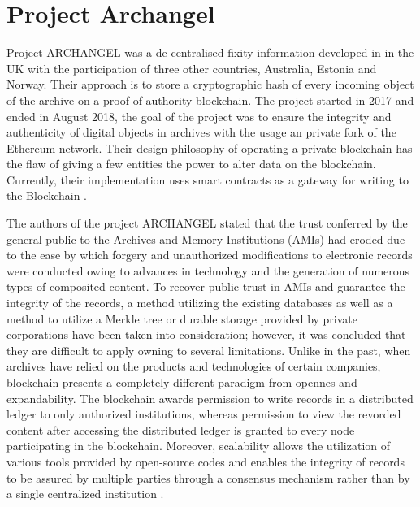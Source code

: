 \section{Project Archangel}
Project ARCHANGEL was a de-centralised fixity information developed in in the UK with the participation of three other countries, Australia, Estonia and Norway. Their approach is to store a cryptographic hash of every incoming object of the archive on a proof-of-authority blockchain. The project started in 2017 and ended in August 2018, the goal of the project was to ensure the integrity and authenticity of digital objects in archives with the usage an private fork of the Ethereum network. Their design philosophy of operating a private blockchain has the flaw of giving a few entities the power to alter data on the blockchain. Currently, their implementation uses smart contracts as a gateway for writing to the Blockchain \cite[4]{collomosse2018archangel}.

The authors of the project ARCHANGEL stated that the trust conferred by the general public to the Archives and Memory Institutions (AMIs) had eroded due to the ease by which forgery and unauthorized modifications to electronic records were conducted owing to advances in technology and the generation of numerous types of composited content. To recover public trust in AMIs and guarantee the integrity of the records, a method utilizing the existing databases as well as a method to utilize a Merkle tree or  durable storage provided by private corporations have been taken into consideration; however, it was concluded that they are difficult to apply owning to several limitations. Unlike in the past, when archives have relied on the products and technologies of certain companies, blockchain presents a completely different paradigm from opennes and expandability. The blockchain awards permission to write records in a distributed ledger to only authorized institutions, whereas permission to view the revorded content after accessing the distributed ledger is granted to every node participating in the blockchain. Moreover, scalability allows the utilization of various tools provided by open-source codes and enables the integrity of records to be assured by multiple parties through a consensus mechanism rather than by a single centralized institution \cite[4]{wang2021research}.

